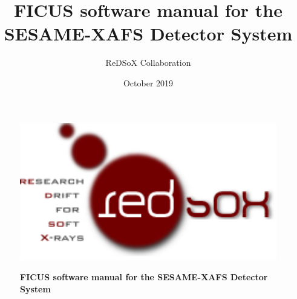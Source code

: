 \documentclass[a4paper,12pt,oneside,pdflatex,italian,final,twocolumn]{article}
\title{FICUS software manual for the SESAME-XAFS Detector System}
\author{ReDSoX Collaboration}
\date{October 2019}
\begin{document}
\pagestyle{fancy}

\chead {\today}


\onecolumn

\begin{figure}
\begin{minipage}{0.37\textwidth}
\centering
\includegraphics[width=1\textwidth,left,]{logo_redsox.png}
\end{minipage}
\hfill
\begin{minipage}{0.57\textwidth}
\raggedleft
\vspace{1cm}
\Huge \textbf{FICUS software manual for the SESAME-XAFS Detector System}
    \vspace{2cm}
\end{minipage}
\end{figure}

    
    \tableofcontents 
    
    \vspace{1cm}
\end{document}
